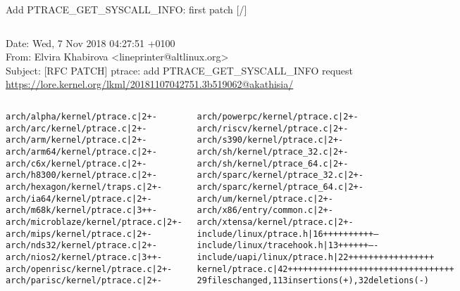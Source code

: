 \documentclass[unicode,aspectratio=169,xcolor={table,dvipsnames,usernames}]{beamer}
\begin{document}
\begin{frame}[fragile]{Add PTRACE\_GET\_SYSCALL\_INFO: first patch \hfill [\insertframenumber/\inserttotalframenumber]}
\begin{columns}
	\column{8.2cm}
		Date: Wed, 7 Nov 2018 04:27:51 +0100 \\ \smallskip
		From: Elvira Khabirova <lineprinter@altlinux.org> \\ \smallskip
		Subject: [RFC PATCH] ptrace: add PTRACE\_GET\_SYSCALL\_INFO request \\ \bigskip
		{\tiny \url{https://lore.kernel.org/lkml/20181107042751.3b519062@akathisia/}}
	\column{3cm}
		\centerline{}
\end{columns}
\begin{columns}
\tiny
	\column{3.5cm}
\begin{alltt}
arch/alpha/kernel/ptrace.c      |  2 +-
arch/arc/kernel/ptrace.c        |  2 +-
arch/arm/kernel/ptrace.c        |  2 +-
arch/arm64/kernel/ptrace.c      |  2 +-
arch/c6x/kernel/ptrace.c        |  2 +-
arch/h8300/kernel/ptrace.c      |  2 +-
arch/hexagon/kernel/traps.c     |  2 +-
arch/ia64/kernel/ptrace.c       |  2 +-
arch/m68k/kernel/ptrace.c       |  3 ++-
arch/microblaze/kernel/ptrace.c |  2 +-
arch/mips/kernel/ptrace.c       |  2 +-
arch/nds32/kernel/ptrace.c      |  2 +-
arch/nios2/kernel/ptrace.c      |  3 ++-
arch/openrisc/kernel/ptrace.c   |  2 +-
arch/parisc/kernel/ptrace.c     |  2 +-
\end{alltt}
	\column{8cm}
\begin{alltt}
arch/powerpc/kernel/ptrace.c    |  2 +-
arch/riscv/kernel/ptrace.c      |  2 +-
arch/s390/kernel/ptrace.c       |  2 +-
arch/sh/kernel/ptrace_32.c      |  2 +-
arch/sh/kernel/ptrace_64.c      |  2 +-
arch/sparc/kernel/ptrace_32.c   |  2 +-
arch/sparc/kernel/ptrace_64.c   |  2 +-
arch/um/kernel/ptrace.c         |  2 +-
arch/x86/entry/common.c         |  2 +-
arch/xtensa/kernel/ptrace.c     |  2 +-
include/linux/ptrace.h          | 16 ++++++++++---
include/linux/tracehook.h       | 13 ++++++----
include/uapi/linux/ptrace.h     | 22 +++++++++++++++++
kernel/ptrace.c                 | 42 +++++++++++++++++++++++++++++++++
29 files changed, 113 insertions(+), 32 deletions(-)
\end{alltt}
\end{columns}
\end{frame}
\end{document}
